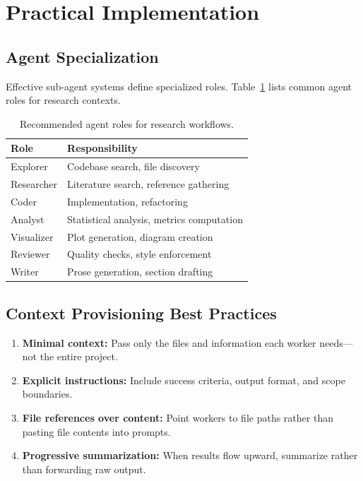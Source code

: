 \documentclass[11pt,letterpaper,twocolumn]{article}
\begin{document}
\section{Practical Implementation}
\label{sec:practical}

\subsection{Agent Specialization}

Effective sub-agent systems define specialized roles.  Table~\ref{tab:roles}
lists common agent roles for research contexts.

\begin{table}[H]
\centering
\caption{Recommended agent roles for research workflows.}
\label{tab:roles}
\small
\begin{tabularx}{\columnwidth}{@{}lX@{}}
\toprule
\textbf{Role} & \textbf{Responsibility} \\
\midrule
Explorer     & Codebase search, file discovery \\
Researcher   & Literature search, reference gathering \\
Coder        & Implementation, refactoring \\
Analyst      & Statistical analysis, metrics computation \\
Visualizer   & Plot generation, diagram creation \\
Reviewer     & Quality checks, style enforcement \\
Writer       & Prose generation, section drafting \\
\bottomrule
\end{tabularx}
\end{table}

\subsection{Context Provisioning Best Practices}

\begin{enumerate}[leftmargin=*,itemsep=2pt]
  \item \textbf{Minimal context:} Pass only the files and information each
    worker needs---not the entire project.
  \item \textbf{Explicit instructions:} Include success criteria, output
    format, and scope boundaries.
  \item \textbf{File references over content:} Point workers to file paths
    rather than pasting file contents into prompts.
  \item \textbf{Progressive summarization:} When results flow upward,
    summarize rather than forwarding raw output.
\end{enumerate}
\end{document}

